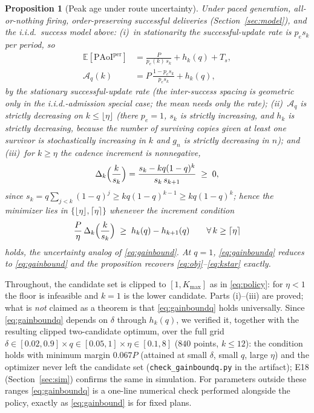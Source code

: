 \documentclass[twocolumn,3p,times,procedia]{elsarticle}
\theoremstyle{plain}
\newtheorem{proposition}{Proposition}
\theoremstyle{remark}
\newcommand{\PAoIper}{\mathrm{PAoI}^{\mathrm{per}}}
\newcommand{\E}{\mathbb{E}}
\newcommand{\peff}{p_e}
\begin{document}
\begin{proposition}[Peak age under route uncertainty]\label{prop:uncertain}
Under paced generation, all-or-nothing firing, order-preserving
successful deliveries (Section~\ref{sec:model}), and the i.i.d.\
success model above:
(i)~in stationarity the successful-update rate is $\peff s_k$ per
period, so
\begin{equation}\label{eq:objq}
\begin{aligned}
\E[\PAoIper]&=\frac{P}{\peff(k)\,s_k}+h_k(q)+T_s,\\
\mathcal{A}_q(k)&=P\,\frac{1-\peff s_k}{\peff s_k}+h_k(q),
\end{aligned}
\end{equation}
by the stationary successful-update rate (the inter-success spacing is
geometric only in the
i.i.d.-admission special case; the \emph{mean} needs only the rate);
(ii)~$\mathcal{A}_q$ is strictly decreasing on $k\le\lfloor\eta\rfloor$
(there $\peff=1$, $s_k$ is strictly increasing, and $h_k$ is strictly
decreasing, because the number of surviving copies given at least one
survivor is stochastically increasing in $k$ and $g_n$ is strictly
decreasing in $n$); and
(iii)~for $k\ge\eta$ the cadence increment is nonnegative,
\begin{equation}\label{eq:dphi}
\Delta_k\Bigl(\frac{k}{s_k}\Bigr)
=\frac{s_k-kq(1-q)^k}{s_k\,s_{k+1}}\;\ge\;0,
\end{equation}
since $s_k=q\sum_{j<k}(1-q)^j\ge kq(1-q)^{k-1}\ge kq(1-q)^k$; hence the
minimizer lies in $\{\lfloor\eta\rfloor,\lceil\eta\rceil\}$ whenever the
increment condition
\begin{equation}\label{eq:gainboundq}
\frac{P}{\eta}\,\Delta_k\Bigl(\frac{k}{s_k}\Bigr)\;\ge\;
h_k(q)-h_{k+1}(q)\qquad\forall\,k\ge\lceil\eta\rceil
\end{equation}
holds, the uncertainty analog of \eqref{eq:gainbound}. At $q=1$,
\eqref{eq:gainboundq} reduces to \eqref{eq:gainbound} and the
proposition recovers \eqref{eq:obj}--\eqref{eq:kstar} exactly.
\end{proposition}

Throughout, the candidate set is clipped to $[1,K_{\max}]$ as in
\eqref{eq:policy}: for $\eta<1$ the floor is infeasible and $k{=}1$ is
the lower candidate.
Parts (i)--(iii) are proved; what is \emph{not} claimed as a theorem is
that \eqref{eq:gainboundq} holds universally. Since
\eqref{eq:gainboundq} depends on $\delta$ through $h_k(q)$, we verified
it, together with the resulting clipped two-candidate optimum, over the full
grid $\delta\in[0.02,0.9]\times q\in[0.05,1]\times\eta\in[0.1,8]$
($840$ points, $k\le12$): the condition holds with minimum margin
$0.067P$ (attained at small $\delta$, small $q$, large $\eta$) and the
optimizer never left the candidate set
(\texttt{check\_gainboundq.py} in the artifact); E18
(Section~\ref{sec:sim}) confirms the same in simulation. For
parameters outside these ranges
\eqref{eq:gainboundq} is a one-line numerical check performed alongside
the policy, exactly as \eqref{eq:gainbound} is for fixed plans.
\end{document}
